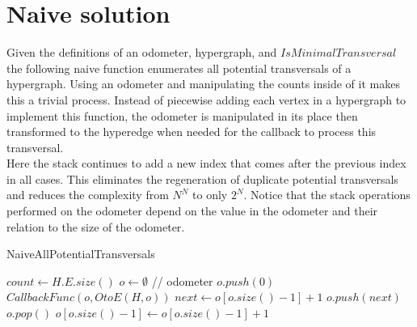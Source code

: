 \chapter{Naive solution}

Given the definitions of an odometer, hypergraph, and $IsMinimalTransversal$ the following naive function enumerates all potential transversals of a hypergraph. Using an odometer and manipulating the counts inside of it makes this a trivial process. Instead of piecewise adding each vertex in a hypergraph to implement this function, the odometer is manipulated in its place then transformed to the hyperedge when needed for the callback to process this transversal. \\

Here the stack continues to add a new index that comes after the previous index in all cases. This eliminates the regeneration of duplicate potential transversals and reduces the complexity from $N^N$ to only $2^N$.  Notice that the stack operations performed on the odometer depend on the value in the odometer and their relation to the size of the odometer.\\

\begin{algorithm}
	\caption{NaiveAllPotentialTransversals}\label{NaiveAllPotentialTransversals}
	\begin{algorithmic}[1]
		\State $count \gets H.E.size()$
		\State $o \gets \emptyset$ // odometer
		\State $o.push(0)$
		 {}
		\State $CallbackFunc(o,OtoE(H,o))$
		\EndIf
		\State $next \gets o[o.size()-1] + 1$ 
		\State $o.push(next)$
		\Else
		\State $o.pop()$
		\State $o[o.size()-1] \gets o[o.size()-1] +1 $
		\EndIf
		\EndIf
		\EndWhile
		\EndFunction
	\end{algorithmic}
\end{algorithm}